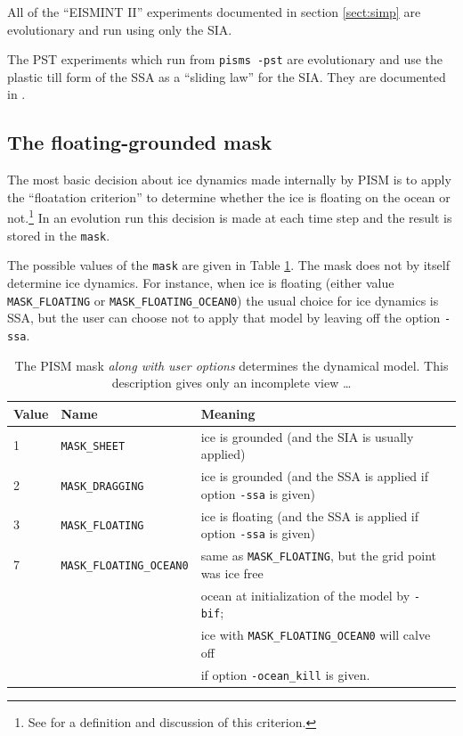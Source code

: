 \documentclass[11pt,final]{amsart}
\renewcommand{\t}[1]{\texttt{#1}}
\begin{document}
All of the ``EISMINT II'' experiments documented in section \ref{sect:simp} are evolutionary and run using only the SIA.

The PST experiments which run from \verb|pisms -pst| are evolutionary and use the plastic till form of the SSA as a ``sliding law'' for the SIA.  They are documented in \cite{BBssasliding}.


\subsection{The floating-grounded mask} \label{subsect:mask}  The most basic decision about ice dynamics made internally by PISM is to apply the ``floatation criterion'' to determine whether the ice is floating on the ocean or not.\footnote{See \cite{WeisGreveHutter} for a definition and discussion of this criterion.}  In an evolution run this decision is made at each time step and the result is stored in the \t{mask}.

The possible values of the \t{mask} are given in Table \ref{tab:maskvals}.  The mask does not by itself determine ice dynamics.  For instance, when ice is floating (either value \verb|MASK_FLOATING| or \verb|MASK_FLOATING_OCEAN0|) the usual choice for ice dynamics is SSA, but the user can choose not to apply that model by leaving off the option \verb|-ssa|.

\begin{table}[ht]
\caption{The PISM mask \emph{along with user options} determines the dynamical model.  This description gives only an incomplete view \dots}\label{tab:maskvals} 
\small
\begin{tabular}{@{}llll}\hline
\textbf{Value} & \textbf{Name} & \textbf{Meaning}\\ \hline
1 & \verb|MASK_SHEET| & ice is grounded (and the SIA is usually applied) \\
2 & \verb|MASK_DRAGGING| & ice is grounded (and the SSA is applied if option \verb|-ssa| is given) \\
3 & \verb|MASK_FLOATING| & ice is floating (and the SSA is applied if option \verb|-ssa| is given) \\
7 & \verb|MASK_FLOATING_OCEAN0| & same as \verb|MASK_FLOATING|, but the grid point was ice free   \\
 & & ocean at initialization of the model by \verb|-bif|;  \\
 & & ice with \verb|MASK_FLOATING_OCEAN0| will calve off  \\
 & & if option \verb|-ocean_kill| is given.\\
\hline\end{tabular}
\normalsize
\end{table}
\end{document}
